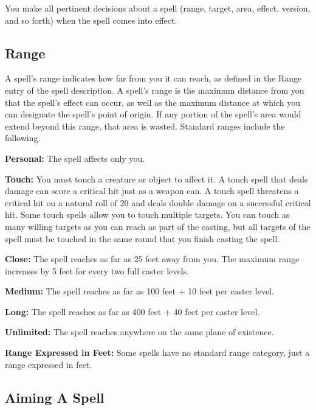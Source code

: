 You make all pertinent decisions about a spell (range, target, area, effect, version, 
and so forth) when the spell comes into effect.

\subsection{Range}

A spell's range indicates how far from you it can reach, as defined in the Range 
entry of the spell description. A spell's range is the maximum distance from you 
that the spell's effect can occur, as well as the maximum distance at which you 
can designate the spell's point of origin. If any portion of the spell's area would 
extend beyond this range, that area is wasted. Standard ranges include the following.

\textbf{Personal:} The spell affects only you.

\textbf{Touch:} You must touch a creature or object to affect it. A touch spell 
that deals damage can score a critical hit just as a weapon can. A touch spell 
threatens a critical hit on a natural roll of 20 and deals double damage on a successful 
critical hit. Some touch spells allow you to touch multiple targets. You can touch 
as many willing targets as you can reach as part of the casting, but all targets 
of the spell must be touched in the same round that you finish casting the spell.

\textbf{Close:} The spell reaches as far as 25 feet away from you. The maximum 
range increases by 5 feet for every two full caster levels.

\textbf{Medium:} The spell reaches as far as 100 feet + 10 feet per caster level.

\textbf{Long:} The spell reaches as far as 400 feet + 40 feet per caster level.

\textbf{Unlimited:} The spell reaches anywhere on the same plane of existence.

\textbf{Range Expressed in Feet:} Some spells have no standard range category, 
just a range expressed in feet.

\subsection{Aiming A Spell}

